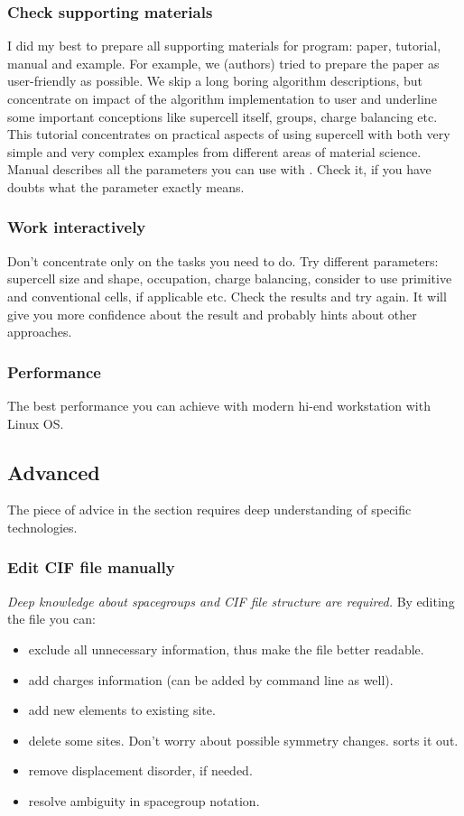 \documentclass[a4paper,10pt]{article}
\begin{document}
\subsubsection{ Check supporting materials }
I did my best to prepare all supporting materials for \sups{} program: paper, tutorial, manual and example. For example, we (authors) tried to prepare the paper as user-friendly as possible. We skip a long boring algorithm descriptions, but concentrate on impact of the algorithm implementation to user and underline some important conceptions like supercell itself, groups, charge balancing etc. This tutorial concentrates on practical aspects of using supercell with both very simple and very complex examples from different areas of material science. Manual describes all the parameters you can use with \sups{}. Check it, if you have doubts what the parameter exactly means.

\subsubsection{ Work interactively }
Don't concentrate only on the tasks you need to do. Try different parameters: supercell size and shape, occupation, charge balancing, consider to use primitive and conventional cells, if applicable etc. Check the results and try again. It will give you more confidence about the result and probably hints about other approaches.

\subsubsection{ Performance }
The best performance you can achieve with modern hi-end workstation with Linux OS.

\subsection*{Advanced}
The piece of advice in the section requires deep understanding of specific technologies.

\subsubsection{ Edit CIF file manually }
\textit{Deep knowledge about spacegroups and CIF file structure are required.} By editing the file you can:
\begin{itemize}
 \item exclude all unnecessary information, thus make the file better readable.
 \item add charges information (can be added by command line as well).
 \item add new elements to existing site.
 \item delete some sites. Don't worry about possible symmetry changes. \Sups{} sorts it out.
 \item remove displacement disorder, if needed.
 \item resolve ambiguity in spacegroup notation.
\end{itemize}
\end{document}

